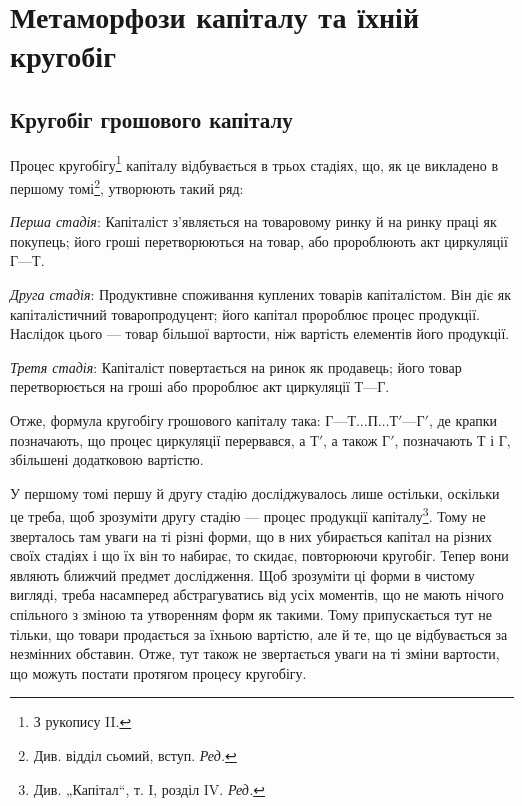 \parcont{}  %

\chapter{Метаморфози капіталу та їхній кругобіг}

\section{Кругобіг грошового капіталу}

\label{original-3}
Процес кругобігу\footnote{
З рукопису II.
} капіталу відбувається в трьох стадіях, що, як
це викладено в першому томі\footnote*{
Див. відділ сьомий, вступ. \emph{Ред.}
}, утворюють такий ряд:

\emph{Перша стадія}: Капіталіст з’являється на товаровому ринку й на
ринку праці як покупець; його гроші перетворюються на товар, або пророблюють
акт циркуляції $Г — Т$.

\emph{Друга стадія}: Продуктивне споживання куплених товарів капіталістом.
Він діє як капіталістичний товаропродуцент; його капітал пророблює
процес продукції. Наслідок цього — товар більшої вартости, ніж
вартість елементів його продукції.

\emph{Третя стадія}: Капіталіст повертається на ринок як продавець; його
товар перетворюється на гроші або пророблює акт циркуляції $Т — Г$.

Отже, формула кругобігу грошового капіталу така: $Г — Т\dots{} П\dots{} Т' —
Г'$, де крапки позначають, що процес циркуляції перервався, а $Т'$, а
також $Г'$, позначають Т і Г, збільшені додатковою вартістю.

У першому томі першу й другу стадію досліджувалось лише остільки,
оскільки це треба, щоб зрозуміти другу стадію — процес продукції капіталу\footnote*{
Див. „Капітал“, т. І, розділ IV. \emph{Ред.}
}.
Тому не зверталось там уваги на ті різні форми, що в них убирається
капітал на різних своїх стадіях і що їх він то набирає, то скидає,
повторюючи кругобіг. Тепер вони являють ближчий предмет дослідження.
Щоб зрозуміти ці форми в чистому вигляді, треба насамперед абстрагуватись
від усіх моментів, що не мають нічого спільного з зміною та
утворенням форм як такими. Тому припускається тут не тільки, що товари
продається за їхньою вартістю, але й те, що це відбувається за
незмінних обставин. Отже, тут також не звертається уваги на ті зміни
вартости, що можуть постати протягом процесу кругобігу.
